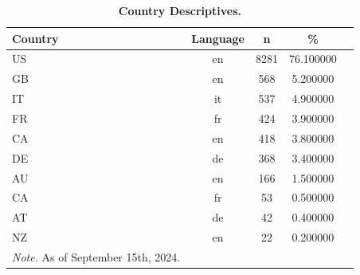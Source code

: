 \begin{table}[H]
\caption{\textbf{Country Descriptives.}}
\label{table:countries_language}
\begin{tabularx}{\textwidth}{X c c c c}
\toprule
Country & Language & n & \% \\
\midrule
US & en & 8281 & 76.100000 \\
GB & en & 568 & 5.200000 \\
IT & it & 537 & 4.900000 \\
FR & fr & 424 & 3.900000 \\
CA & en & 418 & 3.800000 \\
DE & de & 368 & 3.400000 \\
AU & en & 166 & 1.500000 \\
CA & fr & 53 & 0.500000 \\
AT & de & 42 & 0.400000 \\
NZ & en & 22 & 0.200000 \\
\bottomrule
\textit{Note.} As of September 15th, 2024.
\end{tabularx}
\end{table}
